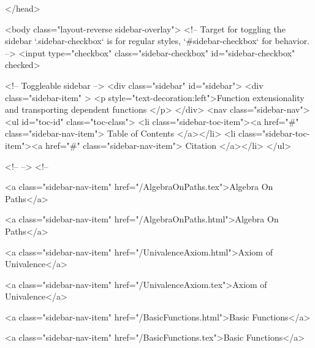   
</head>




  <body class="layout-reverse sidebar-overlay">
    <!-- Target for toggling the sidebar `.sidebar-checkbox` is for regular
     styles, `#sidebar-checkbox` for behavior. -->
<input type="checkbox" class="sidebar-checkbox" id="sidebar-checkbox" checked>

<!-- Toggleable sidebar -->
<div class="sidebar" id="sidebar">
  <div class="sidebar-item" >
    <p style="text-decoration:left">Function extensionality and transporting dependent functions </p>
  </div>
  <nav class="sidebar-nav">
    <ul id="toc-id" class="toc-class">
  <li class="sidebar-toc-item"><a href="#" class="sidebar-nav-item"> Table of Contents </a></li>
  <li class="sidebar-toc-item"><a href="#" class="sidebar-nav-item"> Citation </a></li>
</ul>


    <!--  -->
    <!-- 
      
    
      
    
      
    
      
        
      
    
      
        
          <a class="sidebar-nav-item" href="/AlgebraOnPaths.tex">Algebra On Paths</a>
        
      
    
      
        
          <a class="sidebar-nav-item" href="/AlgebraOnPaths.html">Algebra On Paths</a>
        
      
    
      
        
          <a class="sidebar-nav-item" href="/UnivalenceAxiom.html">Axiom of Univalence</a>
        
      
    
      
        
          <a class="sidebar-nav-item" href="/UnivalenceAxiom.tex">Axiom of Univalence</a>
        
      
    
      
        
          <a class="sidebar-nav-item" href="/BasicFunctions.html">Basic Functions</a>
        
      
    
      
        
          <a class="sidebar-nav-item" href="/BasicFunctions.tex">Basic Functions</a>
        
      
    
